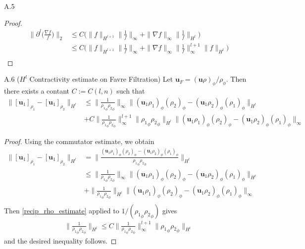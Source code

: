 \documentclass[11pt,letterpaper]{amsart}
\theoremstyle{plain}
\theoremstyle{definition}
\theoremstyle{remark}
\renewcommand{\leq}{\leqslant}
\def\u{\textbf{u}}
\def\dl{\partial^l}
\begin{document}
\begin{customproposition}{A.5}
\begin{proof}
        \begin{align*}
            \Big\| \dl \Big( \frac{\nabla f}{f} \Big) \Big\|_2 
                &\leq C \Big( \|f\|_{H^{l+1}} \Big\|\frac{1}{f} \Big\|_{\infty} + \|\nabla f\|_{\infty} \Big\|\frac{1}{f} \Big\|_{H^l} \Big) \\
                &\leq C \Big( \|f\|_{H^{l+1}} \Big\|\frac{1}{f} \Big\|_{\infty} + \|\nabla f\|_{\infty} \Big\| \frac{1}{f} \Big\|_{\infty}^{l+1} \| f \|_{H^l} \Big) \\
        \end{align*}
    \end{proof}    
\end{customproposition}

\begin{customproposition}{A.6} ($H^l$ Contractivity estimate on Favre Filtration)  
\label{contractivity_estimate}
    Let $\u_F = (\u \rho)_{\phi} / \rho_{\phi}$. Then there exists a contant $C := C(l,n)$ such that 
    \begin{align*}
        \| [\u_1]_{\rho_1} - [\u_1]_{\rho_2} \|_{H^{l}} 
            &\leq \Big\| \frac{1}{{\rho_1}_{\phi} {\rho_2}_{\phi}} \Big\|_{\infty} 
                    \| (\u_1 \rho_1)_{\phi} ({\rho_2})_{\phi} - (\u_1 \rho_2)_{\phi} ({\rho_1})_{\phi} \|_{H^{l}} \\
                &+ C \Big\| \frac{1}{{\rho_1}_{\phi} {\rho_2}_{\phi}} \Big\|_{\infty}^{l+1} \| {\rho_1}_{\phi} {\rho_2}_{\phi} \|_{H^{l}}
                \| (\u_1 \rho_1)_{\phi} ({\rho_2})_{\phi} - (\u_1 \rho_2)_{\phi} ({\rho_1})_{\phi} \|_{\infty}
    \end{align*} 
    \begin{proof}
        Using the commutator estimate, we obtain
        \begin{align*}
        \| [\u_1]_{\rho_1} - [\u_1]_{\rho_2} \|_{H^l} 
            &= \Big\| \frac{ (\u_1 \rho_1)_{\phi} ({\rho_2})_{\phi} 
                - (\u_1 \rho_2)_{\phi} ({\rho_1})_{\phi}}    { {\rho_1}_{\phi} {\rho_2}_{\phi} } \Big\|_{H^l} \\ 
            &\leq \Big\| \frac{1}{{\rho_1}_{\phi} {\rho_2}_{\phi}} \Big\|_{\infty} 
                \| (\u_1 \rho_1)_{\phi} ({\rho_2})_{\phi} - (\u_1 \rho_2)_{\phi} ({\rho_1})_{\phi} \|_{H^l} \\
            &+ \Big\| \frac{1}{{\rho_1}_{\phi} {\rho_2}_{\phi}} \Big\|_{H^l} 
                \| (\u_1 \rho_1)_{\phi} ({\rho_2})_{\phi} - (\u_1 \rho_2)_{\phi} ({\rho_1})_{\phi} \|_{\infty} \\
        \end{align*}
        Then \ref{recip_rho_estimate} applied to $1/({\rho_1}_{\phi} {\rho_2}_{\phi})$ gives 
        \begin{align*}
            \Big\| \frac{1}{{\rho_1}_{\phi} {\rho_2}_{\phi}} \Big\|_{H^l} 
                \leq C \Big\| \frac{1}{{\rho_1}_{\phi} {\rho_2}_{\phi}} \Big\|_{\infty}^{l+1} \| {\rho_1}_{\phi} {\rho_2}_{\phi} \|_{H^l}
        \end{align*}
        and the desired inequality follows. 
    \end{proof}
\end{customproposition}
\end{document}
